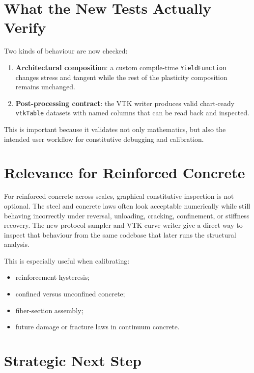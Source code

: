 \section{What the New Tests Actually Verify}

Two kinds of behaviour are now checked:

\begin{enumerate}
  \item \textbf{Architectural composition}: a custom compile-time
        \texttt{YieldFunction} changes stress and tangent while the rest of the
        plasticity composition remains unchanged.
  \item \textbf{Post-processing contract}: the VTK writer produces valid
        chart-ready \texttt{vtkTable} datasets with named columns that can be
        read back and inspected.
\end{enumerate}

This is important because it validates not only mathematics, but also the
intended user workflow for constitutive debugging and calibration.

\section{Relevance for Reinforced Concrete}

For reinforced concrete across scales, graphical constitutive inspection is not
optional.  The steel and concrete laws often look acceptable numerically while
still behaving incorrectly under reversal, unloading, cracking, confinement, or
stiffness recovery.  The new protocol sampler and VTK curve writer give a
direct way to inspect that behaviour from the same codebase that later runs the
structural analysis.

This is especially useful when calibrating:

\begin{itemize}
  \item reinforcement hysteresis;
  \item confined versus unconfined concrete;
  \item fiber-section assembly;
  \item future damage or fracture laws in continuum concrete.
\end{itemize}

\section{Strategic Next Step}

